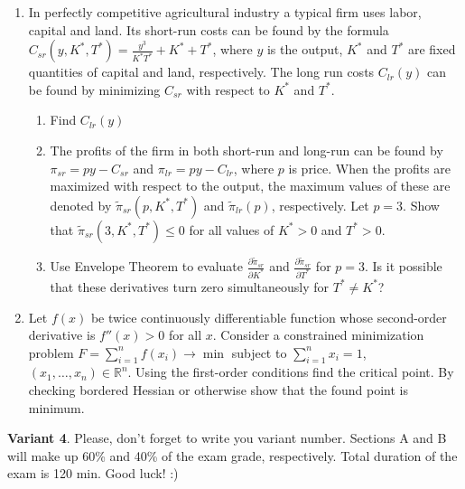 \documentclass[12pt,a4paper]{article}
\begin{document}
\begin{enumerate}[resume]
\item In perfectly competitive agricultural industry a typical firm uses labor, capital and land. Its short-run costs can be found by the formula $C_{sr}(y,K^*,T^*)=\frac{y^3}{K^*T^*}+K^*+T^*$, where $y$  is the output, $K^*$  and $T^*$  are fixed quantities of capital and land, respectively.
The long run costs $C_{lr}(y)$ can be found by minimizing $C_{sr}$ with respect to $K^*$  and $T^*$.
\begin{enumerate} 
\item Find  $C_{lr}(y)$
\item The profits of the firm in both short-run and long-run can be found by $\pi_{sr}=py-C_{sr}$  and   $\pi_{lr}=py-C_{lr}$, where $p$ is price. When the profits are maximized with respect to the output, the maximum values of these are denoted by $\tilde{\pi}_{sr}(p,K^*,T^*)$ and $\tilde{\pi}_{lr}(p)$, respectively. Let $p=3$. Show that $\tilde{\pi}_{sr}(3,K^*,T^*) \leq 0$ for all values of  $K^*>0$  and  $T^*>0$. 
\item Use Envelope Theorem to evaluate $\frac{\partial \tilde{\pi}_{sr}}{\partial K^*}$ and $\frac{\partial \tilde{\pi}_{sr}}{\partial T^*}$ for $p=3$. Is it possible that these derivatives turn zero simultaneously for $T^* \neq K^*$?
\end{enumerate}

\item Let $f(x)$ be twice continuously differentiable function whose second-order derivative is $f''(x)>0$ for all $x$. Consider a constrained minimization problem $F=\sum_{i=1}^n f(x_i) \to \min$ 
subject to $\sum_{i=1}^n x_i = 1$,  $(x_1, \ldots, x_n)\in \mathbb{R}^n$. Using the first-order conditions find the critical point. By checking bordered Hessian or otherwise show that the found point is minimum.
\end{enumerate}



\newpage
\thispagestyle{empty}
\textbf{Variant 4}. Please, don't forget to write you variant number. Sections A and B will make up 60\% and 40\% of the exam grade, respectively. Total duration of the exam is 120 min. Good luck! :) 
\end{document}
